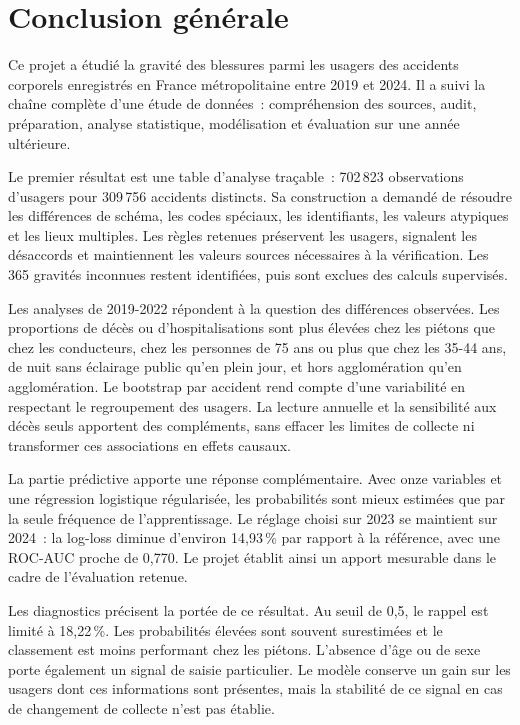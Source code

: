 \chapter*{Conclusion générale}
{}

Ce projet a étudié la gravité des blessures parmi les usagers des accidents corporels
enregistrés en France métropolitaine entre 2019 et 2024. Il a suivi la chaîne complète
d'une étude de données~: compréhension des sources, audit, préparation, analyse
statistique, modélisation et évaluation sur une année ultérieure.

Le premier résultat est une table d'analyse traçable~: 702\,823 observations d'usagers
pour 309\,756 accidents distincts. Sa construction a demandé de résoudre les différences
de schéma, les codes spéciaux, les identifiants, les valeurs atypiques et les lieux
multiples. Les règles retenues préservent les usagers, signalent les désaccords et
maintiennent les valeurs sources nécessaires à la vérification. Les 365 gravités
inconnues restent identifiées, puis sont exclues des calculs supervisés.

Les analyses de 2019-2022 répondent à la question des différences observées. Les
proportions de décès ou d'hospitalisations sont plus élevées chez les piétons que chez
les conducteurs, chez les personnes de 75 ans ou plus que chez les 35-44 ans, de nuit
sans éclairage public qu'en plein jour, et hors agglomération qu'en agglomération.
Le bootstrap par accident rend compte d'une variabilité en respectant le regroupement
des usagers. La lecture annuelle et la sensibilité aux décès seuls apportent des
compléments, sans effacer les limites de collecte ni transformer ces associations
en effets causaux.

La partie prédictive apporte une réponse complémentaire. Avec onze variables et une
régression logistique régularisée, les probabilités sont mieux estimées que par la
seule fréquence de l'apprentissage. Le réglage choisi sur 2023 se maintient sur
2024~: la log-loss diminue d'environ 14,93\,\% par rapport à la référence, avec une
ROC-AUC proche de 0,770. Le projet établit ainsi un apport mesurable dans le cadre
de l'évaluation retenue.

Les diagnostics précisent la portée de ce résultat. Au seuil de 0,5, le rappel est
limité à 18,22\,\%. Les probabilités élevées sont souvent surestimées et le classement
est moins performant chez les piétons. L'absence d'âge ou de sexe porte également un
signal de saisie particulier. Le modèle conserve un gain sur les usagers dont ces
informations sont présentes, mais la stabilité de ce signal en cas de changement
de collecte n'est pas établie.

